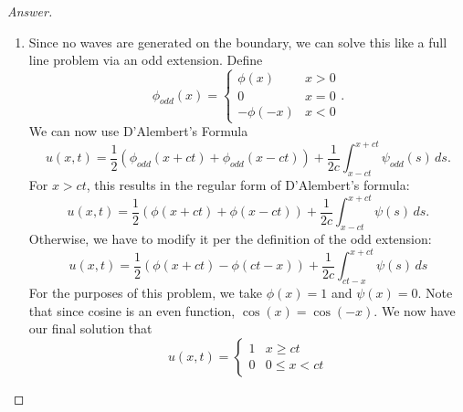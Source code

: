 \documentclass{article}
\theoremstyle{definition}
\renewcommand\qedsymbol{$\blacksquare$}
\newenvironment{ans}{\begin{proof}[Answer]\renewcommand{\qedsymbol}{}}{\end{proof}}
\begin{document}
\begin{ans}
\begin{enumerate}[(1), start=9]
    \item Since no waves are generated on the boundary, we can solve this like a full line problem via an odd extension. Define
    \[\phi_{odd}(x) = \begin{cases}
        \phi(x) & x > 0\\
        0 & x = 0\\
        -\phi(-x) & x < 0
    \end{cases}.\]
    We can now use D'Alembert's Formula
    \[u(x,t) = \frac{1}{2}(\phi_{odd}(x+ct) + \phi_{odd}(x-ct)) + \frac{1}{2c}\int_{x-ct}^{x+ct}\psi_{odd}(s)\,ds.\]
    For $x > ct$, this results in the regular form of D'Alembert's formula:
    \[u(x,t) = \frac{1}{2}(\phi(x+ct) + \phi(x-ct)) + \frac{1}{2c}\int_{x-ct}^{x+ct}\psi(s)\,ds.\]
    Otherwise, we have to modify it per the definition of the odd extension:
    \[u(x,t) = \frac{1}{2}(\phi(x+ct) - \phi(ct-x)) + \frac{1}{2c}\int_{ct-x}^{x+ct}\psi(s)\,ds\]
    For the purposes of this problem, we take $\phi(x) = 1$ and $\psi(x) = 0$. Note that since cosine is an even function, $\cos(x) = \cos(-x)$. We now have our final solution that
    \[\boxed{u(x,t) = \begin{cases}
        1 & x \geq ct\\
        0 & 0 \leq x < ct
    \end{cases}}\]


\end{enumerate}
\end{ans}
\end{document}
